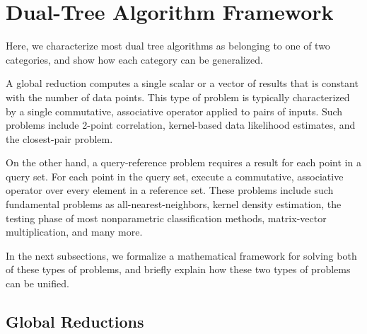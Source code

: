 \documentclass[times, 10pt,twocolumn]{article}
\begin{document}
%
%
%
%
%
%
%
%

\section{Dual-Tree Algorithm Framework}

Here, we characterize most dual tree algorithms as belonging to one of two categories, and show how each category can be generalized.

A global reduction computes a single scalar or a vector of results that is constant with the number of data points.
This type of problem is typically characterized by a single commutative, associative operator applied to pairs of inputs.
Such problems include 2-point correlation, kernel-based data likelihood estimates, and the closest-pair problem.

On the other hand, a query-reference problem requires a result for each point in a query set.
For each point in the query set, execute a commutative, associative operator over every element in a reference set.
These problems include such fundamental problems as all-nearest-neighbors, kernel density estimation, the testing phase of most nonparametric classification methods, matrix-vector multiplication, and many more.

In the next subsections, we formalize a mathematical framework for solving both of these types of problems, and briefly explain how these two types of problems can be unified.

\subsection{Global Reductions}
\end{document}
